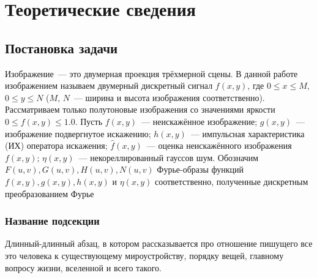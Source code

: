 \chapter{Теоретические сведения}

\section{Постановка задачи}

Изображение~--- это двумерная проекция трёхмерной сцены. В данной работе изображением называем двумерный дискретный сигнал $f(x,y)$, где $0\leq x \leq M$, $0\leq y\leq N$ ($M$, $N$~--- ширина и высота изображения соответственно). Рассматриваем только полутоновые изображения со значениями яркости $0\leq f(x,y)\leq 1.0$. Пусть $f(x,y)$~--- неискажённое изображение; $g(x,y)$~--- изображение подвергнутое искажению; $h(x,y)$~--- импульсная характеристика (ИХ) оператора искажения; $\hat{f}(x,y)$~--- оценка неискажённого изображения $f(x,y)$; $\eta(x,y)$~--- некореллированный гауссов шум.
Обозначим $F(u,v), G(u,v), H(u,v), N(u,v)$ Фурье-образы функций $f(x,y), g(x,y), h(x,y)$ и $\eta(x,y)$ соответственно, полученные дискретным преобразованием Фурье \cite[стр.~284]{gonsalesDigital}




\subsection{Название подсекции}

Длинный-длинный абзац, в котором рассказывается про отношение пишущего все это человека к существующему мироустройству, порядку вещей, главному вопросу жизни, вселенной и всего такого.
